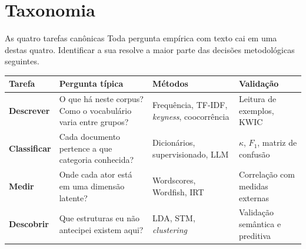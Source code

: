 \documentclass[11pt,aspectratio=169]{beamer}
\begin{document}
\section{Taxonomia}

\begin{frame}{As quatro tarefas canônicas}
Toda pergunta empírica com texto cai em uma destas quatro. Identificar a sua
resolve a maior parte das decisões metodológicas seguintes.
\vspace{0.2cm}
\begin{table}
\scriptsize
\begin{tabular}{p{1.7cm}p{4.1cm}p{3.4cm}p{3.4cm}}
\toprule
\textbf{Tarefa} & \textbf{Pergunta típica} & \textbf{Métodos} & \textbf{Validação} \\
\midrule
\textbf{Descrever} & O que há neste corpus? Como o vocabulário varia entre
grupos? & Frequência, TF-IDF, \emph{keyness}, coocorrência &
Leitura de exemplos, KWIC \\
\addlinespace
\textbf{Classificar} & Cada documento pertence a que categoria conhecida? &
Dicionários, supervisionado, LLM & $\kappa$, $F_1$, matriz de confusão \\
\addlinespace
\textbf{Medir} & Onde cada ator está em uma dimensão latente? &
Wordscores, Wordfish, IRT & Correlação com medidas externas \\
\addlinespace
\textbf{Descobrir} & Que estruturas eu não antecipei existem aqui? &
LDA, STM, \emph{clustering} & Validação semântica e preditiva \\
\bottomrule
\end{tabular}
\end{table}
\end{frame}
\end{document}
